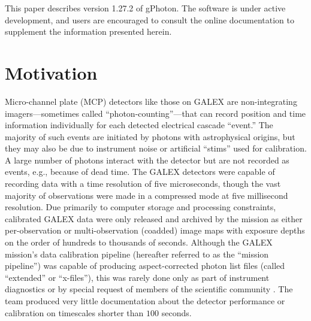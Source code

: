 \documentclass[preprint]{aastex}
\begin{document}
This paper describes version 1.27.2 of gPhoton. The software is under active development, and users are encouraged to consult the online documentation to supplement the information presented herein.

\section{Motivation}
\label{motivation}
Micro-channel plate (MCP) detectors like those on GALEX are non-integrating imagers---sometimes called ``photon-counting''---that can record position and time information individually for each detected electrical cascade ``event.'' The majority of such events are initiated by photons with astrophysical origins, but they may also be due to instrument noise or artificial ``stims'' used for calibration. A large number of photons interact with the detector but are not recorded as events, e.g., because of dead time. The GALEX detectors were capable of recording data with a time resolution of five microseconds, though the vast majority of observations were made in a compressed mode at five millisecond resolution. Due primarily to computer storage and processing constraints, calibrated GALEX data were only released and archived by the mission as either per-observation or multi-observation (coadded) image maps with exposure depths on the order of hundreds to thousands of seconds. Although the GALEX mission's data calibration pipeline (hereafter referred to as the ``mission pipeline'') was capable of producing aspect-corrected photon list files (called ``extended'' or ``x-files''), this was rarely done only as part of instrument diagnostics or by special request of members of the scientific community \citep{rob2005, wel2006, wel2007}. The team produced very little documentation about the detector performance or calibration on timescales shorter than $100$ seconds.
\end{document}
